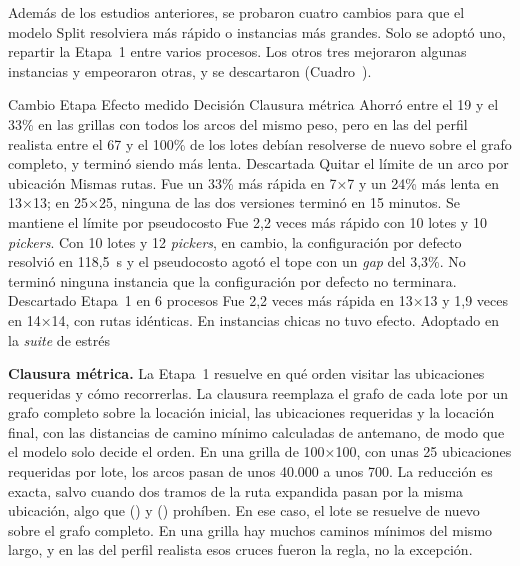 \stopsection

\startsection[title={Intentos para acelerar el modelo Split}, reference=sec:anexo_intentos_split]

Además de los estudios anteriores, se probaron cuatro cambios para que el
modelo Split resolviera más rápido o instancias más grandes. Solo se adoptó
uno, repartir la Etapa~1 entre varios procesos. Los otros tres mejoraron
algunas instancias y empeoraron otras, y se descartaron
(Cuadro~).

\startplacetable[reference=tab:anexo_intentos_split, location=here, title={Cambios probados para acelerar el modelo Split.}]
	\bTABLE[split=yes, align=middle, frame=on, width=fit]
	\setupTABLE[row][1][background=color, backgroundcolor=darkgray, style=bold]
	\setupTABLE[column][1][width=3.4cm, align=flushleft]
	\setupTABLE[column][3][width=6.4cm, align=flushleft]
	\setupTABLE[column][4][width=2.6cm, align=flushleft]
	\bTR \bTH Cambio \eTH \bTH Etapa \eTH \bTH Efecto medido \eTH \bTH Decisión \eTH \eTR
	\bTR \bTD Clausura métrica \eTD {} \eTD \bTD Ahorró entre el 19 y el 33\% en las grillas con todos los arcos del mismo peso, pero en las del perfil realista entre el 67 y el 100\% de los lotes debían resolverse de nuevo sobre el grafo completo, y terminó siendo más lenta. \eTD \bTD Descartada \eTD \eTR
	\bTR \bTD Quitar el límite de un arco por ubicación \eTD {} \eTD \bTD Mismas rutas. Fue un 33\% más rápida en 7×7 y un 24\% más lenta en 13×13; en 25×25, ninguna de las dos versiones terminó en 15 minutos. \eTD \bTD Se mantiene el límite \eTD \eTR
	\bTR {} por pseudocosto \eTD {} \eTD \bTD Fue 2,2 veces más rápido con 10 lotes y 10 {\em pickers}. Con 10 lotes y 12 {\em pickers}, en cambio, la configuración por defecto resolvió en 118,5~s y el pseudocosto agotó el tope con un {\em gap} del 3,3\%. No terminó ninguna instancia que la configuración por defecto no terminara. \eTD \bTD Descartado \eTD \eTR
	\bTR \bTD Etapa~1 en 6 procesos \eTD {} \eTD \bTD Fue 2,2 veces más rápida en 13×13 y 1,9 veces en 14×14, con rutas idénticas. En instancias chicas no tuvo efecto. \eTD \bTD Adoptado en la {\em suite} de estrés \eTD \eTR
	\eTABLE
\stopplacetable

{\bf Clausura métrica.} La Etapa~1 resuelve en qué orden visitar las
ubicaciones requeridas y cómo recorrerlas. La clausura reemplaza el
grafo de cada lote por un grafo completo sobre la locación inicial, las ubicaciones
requeridas y la locación final, con las distancias de camino mínimo
calculadas de antemano, de modo que el modelo solo decide el orden. En una
grilla de 100×100, con unas 25 ubicaciones requeridas por lote, los arcos
pasan de unos 40.000 a unos 700. La reducción es exacta, salvo cuando dos
tramos de la ruta expandida pasan por la misma ubicación, algo que
() y () prohíben. En ese caso, el
lote se resuelve de nuevo sobre el grafo completo. En una grilla hay muchos
caminos mínimos del mismo largo, y en las del perfil realista esos cruces
fueron la regla, no la excepción.

